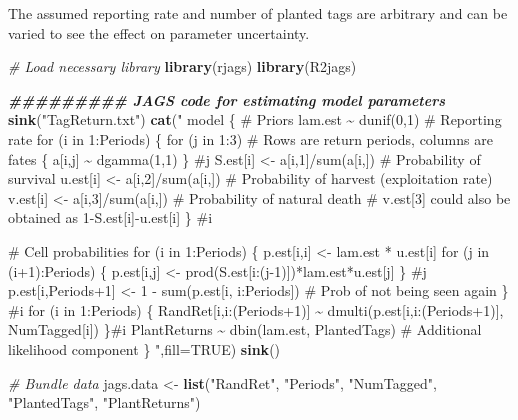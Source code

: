 \documentclass[
]{krantz}
\makeatletter
\newenvironment{Shaded}{\begin{snugshade}}{\end{snugshade}}
\newcommand{\AttributeTok}[1]{\textcolor[rgb]{0.27,0.27,0.27}{#1}}
\newcommand{\CommentTok}[1]{\textcolor[rgb]{0.37,0.37,0.37}{\textit{#1}}}
\newcommand{\ConstantTok}[1]{\textcolor[rgb]{0.37,0.37,0.37}{#1}}
\newcommand{\DocumentationTok}[1]{\textcolor[rgb]{0.37,0.37,0.37}{\textbf{\textit{#1}}}}
\newcommand{\FunctionTok}[1]{\textcolor[rgb]{0.27,0.27,0.27}{\textbf{#1}}}
\newcommand{\NormalTok}[1]{#1}
\newcommand{\OtherTok}[1]{\textcolor[rgb]{0.37,0.37,0.37}{#1}}
\newcommand{\StringTok}[1]{\textcolor[rgb]{0.5,0.5,0.5}{#1}}
\newenvironment{kframe}{%
\medskip{}
\setlength{\fboxsep}{.8em}
 \def\at@end@of@kframe{}%
 \ifinner\ifhmode%
  \def\at@end@of@kframe{\end{minipage}}%
  \begin{minipage}{\columnwidth}%
 \fi\fi%
 \def\FrameCommand##1{\hskip\@totalleftmargin \hskip-\fboxsep
 \colorbox{shadecolor}{##1}\hskip-\fboxsep
     \hskip-\linewidth \hskip-\@totalleftmargin \hskip\columnwidth}%
 \MakeFramed {\advance\hsize-\width
   \@totalleftmargin\z@ \linewidth\hsize
   \@setminipage}}%
 {\par\unskip\endMakeFramed%
 \at@end@of@kframe}
\renewenvironment{Shaded}{\begin{kframe}}{\end{kframe}}
\makeatother
\begin{document}
The assumed reporting rate and number of planted tags are arbitrary and can be varied to see the effect on parameter uncertainty.

\begin{Shaded}
\begin{Highlighting}[]
\CommentTok{\# Load necessary library}
\FunctionTok{library}\NormalTok{(rjags)}
\FunctionTok{library}\NormalTok{(R2jags)}

  \DocumentationTok{\#\#\#\#\#\#\#\#\# JAGS code for estimating model parameters}
  \FunctionTok{sink}\NormalTok{(}\StringTok{"TagReturn.txt"}\NormalTok{)}
  \FunctionTok{cat}\NormalTok{(}\StringTok{"}
\StringTok{  model \{}
\StringTok{  \# Priors}
\StringTok{  lam.est \textasciitilde{} dunif(0,1) \# Reporting rate}
\StringTok{  for (i in 1:Periods) \{}
\StringTok{     for (j in 1:3) \# Rows are return periods, columns are fates}
\StringTok{       \{}
\StringTok{         a[i,j] \textasciitilde{} dgamma(1,1)}
\StringTok{       \} \#j}
\StringTok{     S.est[i] \textless{}{-} a[i,1]/sum(a[i,]) \# Probability of survival}
\StringTok{     u.est[i] \textless{}{-} a[i,2]/sum(a[i,]) \# Probability of harvest (exploitation rate)}
\StringTok{     v.est[i] \textless{}{-} a[i,3]/sum(a[i,]) \# Probability of natural death}
\StringTok{     \# v.est[3] could also be obtained as 1{-}S.est[i]{-}u.est[i]}
\StringTok{  \} \#i}

\StringTok{\# Cell probabilities}
\StringTok{  for (i in 1:Periods) \{}
\StringTok{    p.est[i,i] \textless{}{-} lam.est * u.est[i]}
\StringTok{    for (j in (i+1):Periods) \{}
\StringTok{      p.est[i,j] \textless{}{-} prod(S.est[i:(j{-}1)])*lam.est*u.est[j]}
\StringTok{      \} \#j}
\StringTok{    p.est[i,Periods+1] \textless{}{-} 1 {-} sum(p.est[i, i:Periods])   \# Prob of not being seen again}
\StringTok{    \} \#i}
\StringTok{  for (i in 1:Periods) \{}
\StringTok{  RandRet[i,i:(Periods+1)] \textasciitilde{} dmulti(p.est[i,i:(Periods+1)], NumTagged[i])}
\StringTok{  \}\#i}
\StringTok{  PlantReturns \textasciitilde{} dbin(lam.est, PlantedTags) \# Additional likelihood component}
\StringTok{ \}}
\StringTok{  "}\NormalTok{,}\AttributeTok{fill=}\ConstantTok{TRUE}\NormalTok{)}
  \FunctionTok{sink}\NormalTok{()}

\CommentTok{\# Bundle data}
\NormalTok{  jags.data }\OtherTok{\textless{}{-}} \FunctionTok{list}\NormalTok{(}\StringTok{"RandRet"}\NormalTok{, }\StringTok{"Periods"}\NormalTok{, }\StringTok{"NumTagged"}\NormalTok{, }\StringTok{"PlantedTags"}\NormalTok{, }\StringTok{"PlantReturns"}\NormalTok{)}


\end{Highlighting}
\end{Shaded}
\end{document}
